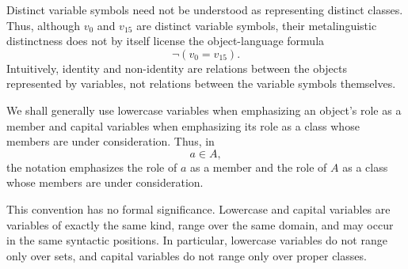 Distinct variable symbols need not be understood as representing distinct classes. Thus, although \(v_0\) and \(v_{15}\) are distinct variable symbols, their metalinguistic distinctness does not by itself license the object-language formula
\[
\neg(v_0= v_{15}).
\]
Intuitively, identity and non-identity are relations between the objects represented by variables, not relations between the variable symbols themselves.

We shall generally use lowercase variables when emphasizing an object's role as a member and capital variables when emphasizing its role as a class whose members are under consideration. Thus, in
\[
a\in A,
\]
the notation emphasizes the role of \(a\) as a member and the role of \(A\) as a class whose members are under consideration.

This convention has no formal significance. Lowercase and capital variables are variables of exactly the same kind, range over the same domain, and may occur in the same syntactic positions. In particular, lowercase variables do not range only over sets, and capital variables do not range only over proper classes.